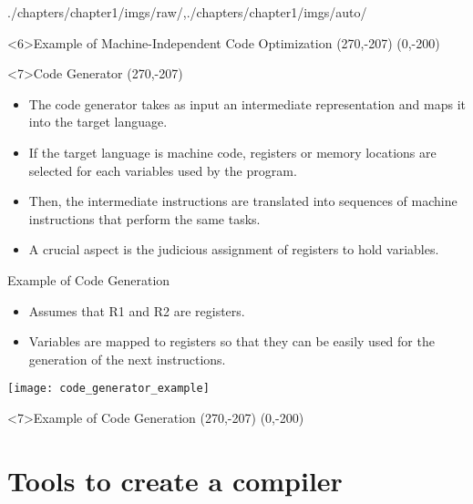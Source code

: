 \begin{graphicspathcontext}{{./chapters/chapter1/imgs/raw/},{./chapters/chapter1/imgs/auto/}}
\begin{bibunit}[apalike]

\begin{frame}<6>{Example of Machine-Independent Code Optimization}
	\putat(270,-207){}
	\putat(0,-200){}
\end{frame}

\begin{frame}<7>{Code Generator}
	\putat(270,-207){}
	\begin{minipage}{.8\linewidth}
	\begin{itemize}
	\item The code generator takes as input an intermediate representation and maps it into the target language.
	\vfill
	\item If the target language is machine code, registers or memory locations are selected for each variables used by the program.
	\item Then, the intermediate instructions are translated into sequences of machine instructions that perform the same tasks.
	\vfill
	\item A crucial aspect is the judicious assignment of registers to hold variables.
	\end{itemize}
	\end{minipage}
\end{frame}

\begin{frame}{Example of Code Generation}
	\begin{itemize}
	\item Assumes that R1 and R2 are registers.
	\item Variables are mapped to registers so that they can be easily used for the generation of the next instructions.
	\end{itemize}
	\vfill
	\texttt{[image: code\_generator\_example]}
\end{frame}

\begin{frame}<7>{Example of Code Generation}
	\putat(270,-207){}
	\putat(0,-200){}
\end{frame}

\section{Tools to create a compiler}


\end{bibunit}
\end{graphicspathcontext}
